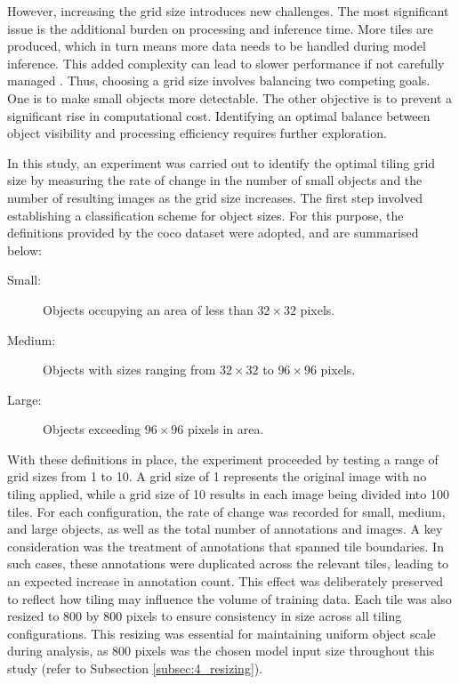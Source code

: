 However, increasing the grid size introduces new challenges. The most significant issue is the additional burden on processing and inference time. More tiles are produced, which in turn means more data needs to be handled during model inference. This added complexity can lead to slower performance if not carefully managed \cite{tiling}.
Thus, choosing a grid size involves balancing two competing goals. One is to make small objects more detectable. The other objective is to prevent a significant rise in computational cost. Identifying an optimal balance between object visibility and processing efficiency requires further exploration.

In this study, an experiment was carried out to identify the optimal tiling grid size by measuring the rate of change in the number of small objects and the number of resulting images as the grid size increases. The first step involved establishing a classification scheme for object sizes. For this purpose, the definitions provided by the \gls{coco} dataset \cite{coco} were adopted, and are summarised below:

\begin{adjustwidth}{4em}{0pt} %
\begin{description}
    \item[Small:] Objects occupying an area of less than $32 \times 32$ pixels.
    \item[Medium:] Objects with sizes ranging from $32 \times 32$ to $96 \times 96$ pixels.
    \item[Large:] Objects exceeding $96 \times 96$ pixels in area.
\end{description}
\end{adjustwidth}

With these definitions in place, the experiment proceeded by testing a range of grid sizes from 1 to 10. A grid size of 1 represents the original image with no tiling applied, while a grid size of 10 results in each image being divided into 100 tiles. For each configuration, the rate of change was recorded for small, medium, and large objects, as well as the total number of annotations and images.
A key consideration was the treatment of annotations that spanned tile boundaries. In such cases, these annotations were duplicated across the relevant tiles, leading to an expected increase in annotation count. This effect was deliberately preserved to reflect how tiling may influence the volume of training data. Each tile was also resized to 800 by 800 pixels to ensure consistency in size across all tiling configurations. This resizing was essential for maintaining uniform object scale during analysis, as 800 pixels was the chosen model input size throughout this study (refer to Subsection \ref{subsec:4_resizing}).


